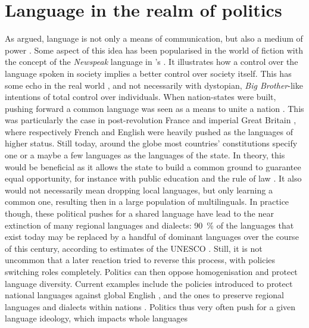 \documentclass[../thesis.tex]{subfiles}
\begin{document}
\section{Language in the realm of politics}
As  argued, language is not only a
means of communication, but also a medium of power \cite{BourdieuLanguageSymbolic2009}.
Some aspect of this idea has been popularised in the world of fiction with the concept
of the \emph{Newspeak} language in 's
 \cite{Orwell19841950}. It illustrates how a control over the
language spoken in society implies a better control over society itself. This has some
echo in the real world \cite{FowlerLanguageControl1979}, and not necessarily with
dystopian, \emph{Big Brother}-like intentions of total control over individuals. When
nation-states were built, pushing forward a common language was seen as a means to unite
a nation \cite{WrightCommunityCommunication2000}. This was particularly the case in
post-revolution France and imperial Great Britain
\cite{GrilloDominantLanguages1989,HigonnetPoliticsLinguistic1980}, where respectively
French and English were heavily pushed as the languages of higher status. Still today,
around the globe most countries' constitutions specify one or a maybe a few languages as
the languages of the state. In theory, this would be beneficial as it allows the state
to build a common ground to guarantee equal opportunity, for instance with public
education and the rule of law \cite{FergusonLanguageFactor1962}. It also would not
necessarily mean dropping local languages, but only learning a common one, resulting
then in a large population of multilinguals. In practice though, these political pushes
for a shared language have lead to the near extinction of many regional languages and
dialects: \SI{90}{\percent} of the languages that exist today may be replaced by a
handful of dominant languages over the course of this century, according to estimates of
the UNESCO \cite{UNESCOLanguageVitality2003}. Still, it is not uncommon that a later
reaction tried to reverse this process, with policies switching roles completely.
Politics can then oppose homogenisation and protect language diversity. Current examples
include the policies introduced to protect national languages against global English
\cite{SonntagLocalPolitics2003}, and the ones to preserve regional languages and
dialects within nations \cite{KaplanLanguagePlanning1997}. Politics thus very often push
for a given language ideology, which impacts whole languages
\end{document}
